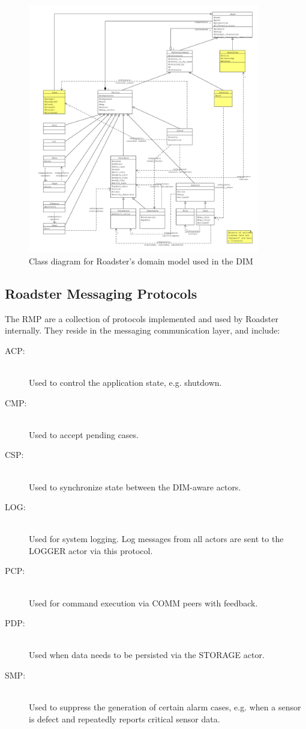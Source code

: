 \begin{figure}[]
	\includegraphics[trim=1.5cm 1cm 1cm 1cm, clip=true, width=0.9\textwidth]{img/meta_model.pdf}
	\caption{Class diagram for Roadster's domain model used in the DIM}
	\label{fig:roadster:meta-model}
\end{figure}

\subsection{Roadster Messaging Protocols}\label{sec:rmp}
The \gls{RMP} are a collection of protocols implemented and used by Roadster
internally. They reside in the messaging communication layer, and include:

\begin{description}
	\item [\gls{ACP}:]\hfill\\
		Used to control the application state, e.g. shutdown.
	\item [\gls{CMP}:]\hfill\\
		Used to accept pending \glspl{case}.
	\item [\gls{CSP}:]\hfill\\
		Used to synchronize state between the DIM-aware actors.
	\item [\gls{LOG}:]\hfill\\
		Used for system logging. Log messages from all actors are sent
		to the LOGGER actor via this protocol.
	\item [\gls{PCP}:]\hfill\\
		Used for command execution via COMM peers with feedback.
	\item [\gls{PDP}:]\hfill\\
		Used when data needs to be persisted via the STORAGE actor.
	\item [\gls{SMP}:]\hfill\\
		Used to suppress the generation of certain alarm cases, e.g.
		when a sensor is defect and repeatedly reports critical sensor data.
\end{description}

